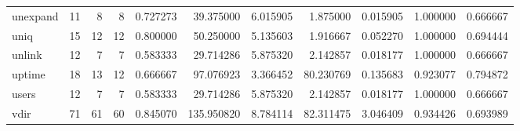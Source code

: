 \begin{tabular}{lrrrrrrrrrr}
unexpand  &                                      11 &                  8 &                                 8 &                                   0.727273 &                              39.375000 &                                     6.015905 &                          1.875000 &                                0.015905 &                           1.000000 &                                           0.666667 \\
uniq      &                                      15 &                 12 &                                12 &                                   0.800000 &                              50.250000 &                                     5.135603 &                          1.916667 &                                0.052270 &                           1.000000 &                                           0.694444 \\
unlink    &                                      12 &                  7 &                                 7 &                                   0.583333 &                              29.714286 &                                     5.875320 &                          2.142857 &                                0.018177 &                           1.000000 &                                           0.666667 \\
uptime    &                                      18 &                 13 &                                12 &                                   0.666667 &                              97.076923 &                                     3.366452 &                         80.230769 &                                0.135683 &                           0.923077 &                                           0.794872 \\
users     &                                      12 &                  7 &                                 7 &                                   0.583333 &                              29.714286 &                                     5.875320 &                          2.142857 &                                0.018177 &                           1.000000 &                                           0.666667 \\
vdir      &                                      71 &                 61 &                                60 &                                   0.845070 &                             135.950820 &                                     8.784114 &                         82.311475 &                                3.046409 &                           0.934426 &                                           0.693989 \\

\end{tabular}
